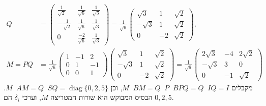 \documentclass{article}
\DeclareMathOperator{\tra}{^t}
\DeclareMathOperator{\inv}{^{-1}}
\DeclareMathOperator{\diag}{diag}
\begin{document}
\begin{align*}
    Q    & =\begin{pmatrix}
                \frac{1}{\sqrt{2}}   & \frac{1}{\sqrt{6}}  & \frac{1}{\sqrt{3}} \\
                - \frac{1}{\sqrt{2}} & \frac{1}{\sqrt{6}}  & \frac{1}{\sqrt{3}} \\
                0                    & \frac{-2}{\sqrt{6}} & \frac{1}{\sqrt{3}}
            \end{pmatrix} = \frac{1}{\sqrt{6}} \begin{pmatrix}
                                                   \sqrt{3}  & 1  & \sqrt{2} \\
                                                   -\sqrt{3} & 1  & \sqrt{2} \\
                                                   0         & -2 & \sqrt{2}
                                               \end{pmatrix}, \\
    M=PQ & = \frac{1}{\sqrt{6}}\begin{pmatrix}
                                   1 & -1 & 2  \\
                                   0 & 1  & -1 \\
                                   0 & 0  & 1
                               \end{pmatrix}\begin{pmatrix}
                                                \sqrt{3}  & 1  & \sqrt{2} \\
                                                -\sqrt{3} & 1  & \sqrt{2} \\
                                                0         & -2 & \sqrt{2}
                                            \end{pmatrix}=\frac{1}{\sqrt{6}}\begin{pmatrix}
                                                                                2\sqrt{3} & -4 & 2\sqrt{2} \\
                                                                                -\sqrt{3} & 3  & 0         \\
                                                                                0         & -1 & \sqrt{2}
                                                                            \end{pmatrix}
\end{align*}
מקבלים $M\tra B M = Q \tra P \tra B P Q = Q\inv I Q = I$, וכן $M\tra A M=Q\tra S Q = \diag\{0, 2, 5\}$.
הבסיס המבוקש הוא שורות המטריצה $M$, וערכי $\delta_i$ הם $0, 2, 5$.
\end{document}
